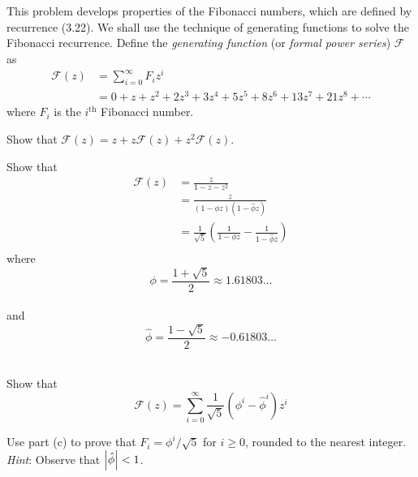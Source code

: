 \item{}
This problem develops properties of the Fibonacci numbers, which are defined by
recurrence (3.22). We shall use the technique of generating functions to solve
the Fibonacci recurrence. Define the \emph{generating function} (or \emph{formal
power series}) $\mathscr{F}$ as
\begin{align*}
\mathscr{F}(z)&=\sum_{i=0}^\infty F_iz^i\\
&=0+z+z^2+2z^3+3z^4+5z^5+8z^6+13z^7+21z^8+\cdots
\end{align*}
where $F_i$ is the $i^{\text{th}}$ Fibonacci number.
\begin{list}{\textbf{}}{}
\item Show that $\mathscr{F}(z)=z+z\mathscr{F}(z)+z^2\mathscr{F}(z)$.
\item Show that
\begin{align*}
\mathscr{F}(z)&=\frac{z}{1-z-z^2}\\
&=\frac{z}{\left(1-\phi z\right)\left(1-\hat\phi z\right)}\\
&=\frac{1}{\sqrt{5}}\left(\frac{1}{1-\phi z}-\frac{1}{1-\hat\phi z}\right)\\
\end{align*}
where $$\phi=\frac{1+\sqrt{5}}{2}\approx1.61803\ldots$$\\
and $$\hat\phi=\frac{1-\sqrt{5}}{2}\approx-0.61803\ldots$$\\
\item Show that $$\mathscr{F}(z)=\sum_{i=0}^\infty\frac{1}{\sqrt{5}}\left(
\phi^i-\hat\phi^i\right)z^i$$
\item Use part (c) to prove that $F_i=\phi^i/\sqrt{5}$ for $i\ge 0$, rounded
to the nearest integer. \emph{Hint\/}: Observe that $\left^^7c\hat\phi\right^^7c
<1$.
\end{list}
\vskip12pt
\ifanswers
